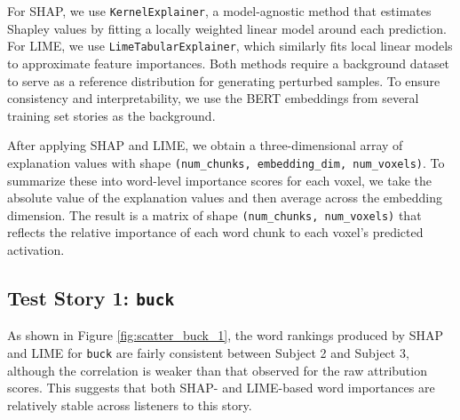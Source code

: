 \documentclass[10pt,letterpaper]{article}
\begin{document}
For SHAP, we use \texttt{KernelExplainer}, a model-agnostic method that estimates Shapley values by fitting a locally weighted linear model around each prediction. For LIME, we use \texttt{LimeTabularExplainer}, which similarly fits local linear models to approximate feature importances. Both methods require a background dataset to serve as a reference distribution for generating perturbed samples. To ensure consistency and interpretability, we use the BERT embeddings from several training set stories as the background.

After applying SHAP and LIME, we obtain a three-dimensional array of explanation values with shape \texttt{(num\_chunks, embedding\_dim, num\_voxels)}. To summarize these into word-level importance scores for each voxel, we take the absolute value of the explanation values and then average across the embedding dimension. The result is a matrix of shape \texttt{(num\_chunks, num\_voxels)} that reflects the relative importance of each word chunk to each voxel’s predicted activation.

\subsection{Test Story 1: \texttt{buck}}

As shown in Figure \ref{fig:scatter_buck_1}, the word rankings produced by SHAP and LIME for \texttt{buck} are fairly consistent between Subject 2 and Subject 3, although the correlation is weaker than that observed for the raw attribution scores. This suggests that both SHAP- and LIME-based word importances are relatively stable across listeners to this story.
\end{document}
